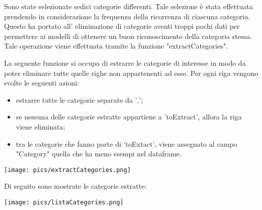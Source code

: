 \documentclass[12pt,oneside]{article}
\begin{document}
\begin{enumerate}
    \begin{justify}
    Sono state selezionate sedici categorie differenti. Tale selezione è stata effettuata prendendo in considerazione la frequenza della ricorrenza di ciascuna categoria. Questo ha portato all' eliminazione di categorie aventi troppi pochi dati per permettere ai modelli di ottenere un buon riconoscimento della categoria stessa. Tale operazione viene effettuata tramite la funzione "extractCategories".
    \end{justify}

    \begin{justify}
    La seguente funzione si occupa di estrarre le categorie di interesse in modo da poter eliminare tutte quelle righe non appartenenti ad esse. 
    Per ogni riga vengono svolte le seguenti azioni:
    \begin{itemize}
        \item estrarre tutte le categorie separate da ',';
        \item se nessuna delle categorie estratte appartiene a 'toExtract', allora la riga viene eliminata;
        \item tra le categorie che fanno parte di 'toExtact', viene assegnato al campo "Category" quella che ha meno esempi nel dataframe.
    \end{itemize}
    \end{justify}

    \texttt{[image: pics/extractCategories.png]}

    \begin{justify}
    Di seguito sono mostrate le categorie estratte: 
    \end{justify}
    \texttt{[image: pics/listaCategories.png]}


\end{enumerate}
\end{document}
